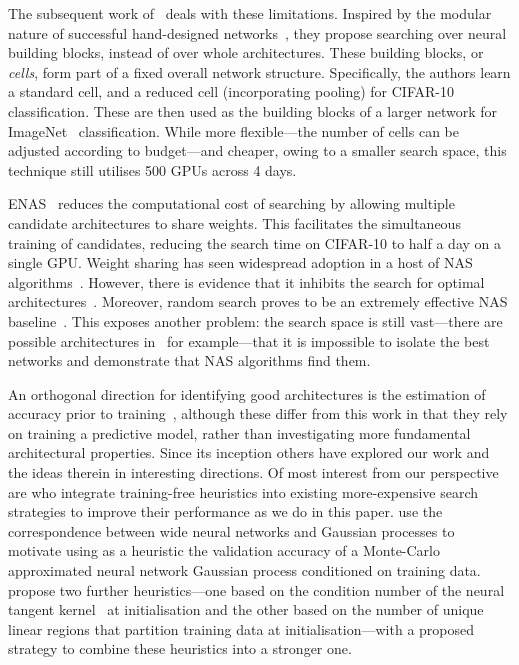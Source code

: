 \documentclass{article}
\begin{document}
The subsequent work of~\cite{zoph2018learning} deals with these limitations. Inspired by the modular nature of successful hand-designed networks~\citep{simonyan2015very,he2016deep,huang2017densely}, they propose searching over neural building blocks, instead of over whole architectures. These building blocks, or {\it cells}, form part of a fixed overall network structure. Specifically, the authors learn a standard cell, and a reduced cell (incorporating pooling) for CIFAR-10 classification. These are then used as the building blocks of a larger network for ImageNet~\citep{russakovsky2015imagenet} classification. While more flexible---the number of cells can be adjusted according to budget---and cheaper, owing to a smaller search space, this technique still utilises 500 GPUs across 4 days.

ENAS~\citep{pham2018efficient} reduces the computational cost of searching by allowing multiple candidate architectures to share weights. This facilitates the simultaneous training of candidates, reducing the search time on CIFAR-10 to half a day on a single GPU. Weight sharing has seen widespread adoption in a host of NAS algorithms~\citep{liu2019darts,luo2018neural,cai2019proxylessnas,xie2019snas,brock2018smash}. However, there is evidence that it inhibits the search for optimal architectures~\citep{yu2020evaluating}. Moreover, random search proves to be an extremely effective NAS baseline~\citep{yu2020evaluating,li2019random}. This exposes another problem: the search space is still vast---there are  possible architectures in~\cite{pham2018efficient} for example---that it is impossible to isolate the best networks and demonstrate that NAS algorithms find them.

An orthogonal direction for identifying good architectures is the estimation of accuracy prior to training~\citep{deng2017peephole,istrate2019tapas}, although these differ from this work in that they rely on training a predictive model, rather than investigating more fundamental architectural properties. 
Since its inception others have explored our work and the ideas therein in interesting directions. Of most interest from our perspective are \citet{abdelfattah2021zerocost} who integrate training-free heuristics into existing more-expensive search strategies to improve their performance  as we do in this paper. 
\citet{park2020towards} use the correspondence between wide neural networks and Gaussian processes to motivate using as a heuristic the validation accuracy of a Monte-Carlo approximated neural network Gaussian process conditioned on training data. \citet{chen2021neural} propose two further heuristics---one based on the condition number of the neural tangent kernel~\citep{jacot2018neural} at initialisation and the other based on the number of unique linear regions that partition training data at initialisation---with a proposed strategy to combine these heuristics into a stronger one.
\end{document}

